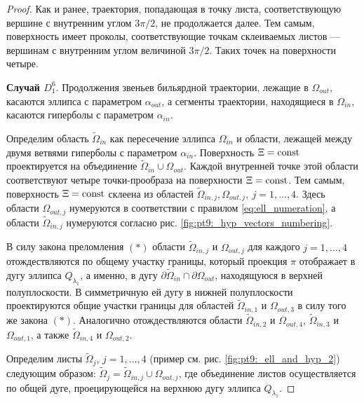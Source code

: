\begin{proof}
Как и ранее, траектория, попадающая в точку листа, соответствующую вершине с внутренним углом $3\pi / 2$, не продолжается далее. %
Тем самым, поверхность имеет проколы, соответствующие точкам склеиваемых листов --- вершинам с внутренним углом величиной $3\pi / 2$. 
Таких точек на поверхности четыре.  %


\textbf{Случай $D_1^6$}.
Продолжения звеньев бильярдной траектории, лежащие в $\Omega_{out}$, касаются эллипса с параметром $\alpha_{out}$, а сегменты траектории, находящиеся в $\Omega_{in}$, касаются гиперболы с параметром $\alpha_{in}$. 

Определим область $\widetilde{\Omega}_{in}$ как пересечение эллипса $\Omega_{in}$ и области, лежащей между двумя ветвями гиперболы с параметром $\alpha_{in}$.
Поверхность  $\Xi = \mathrm{const}$ проектируется на объединение $\widetilde{\Omega}_{in} \cup \Omega_{out}$. 
Каждой внутренней точке этой области соответствуют четыре точки-прообраза на поверхности $\Xi = \mathrm{const}$.
Тем самым, поверхность $\Xi = \mathrm{const}$ склеена из областей $\widetilde{\Omega}_{in, j}, \Omega_{out, j}, \ j=1,\ldots,4$.
Здесь области $\Omega_{out, j}$ нумеруются в соответствии с правилом \eqref{eq:ell_numeration}, а области $\widetilde{\Omega}_{in, j}$ нумеруются согласно рис. \ref{fig:pt9:_hyp_vectors_numbering}.


В силу закона преломления $(\ast)$ области $\widetilde{\Omega}_{in, j}$ и $\Omega_{out, j}$ для каждого $j=1,\ldots, 4$ отождествляются по общему участку границы, который проекция $\pi$ отображает в дугу эллипса $Q_{\lambda_1}$, а именно, в дугу $\partial \widetilde{\Omega}_{in} \cap \partial \Omega_{out}$, находящуюся в верхней полуплоскости.
В симметричную ей дугу в нижней полуплоскости проектируются общие участки границы для областей $\widetilde{\Omega}_{in, 1}$ и $\Omega_{out, 3}$ в силу того же закона $(\ast)$. Аналогично отождествляются области $\widetilde{\Omega}_{in, 2}$ и $\Omega_{out, 4}$, $\widetilde{\Omega}_{in, 3}$ и $\Omega_{out, 1}$, а также $\widetilde{\Omega}_{in, 4}$ и $\Omega_{out, 2}$.

Определим листы $\widetilde{\Omega}_j$, $j=1, \ldots, 4$ (пример см. рис. \ref{fig:pt9:_ell_and_hyp_2}) следующим образом: 
$\widetilde{\Omega}_j = \widetilde{\Omega}_{in, j} \cup \Omega_{out, j}$, где объединение листов осуществляется по общей дуге, проецирующейся на верхнюю дугу эллипса $Q_{\lambda_1}$.


\end{proof}
